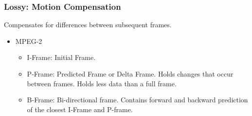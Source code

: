\documentclass{beamer}
\begin{document}
   
\begin{frame}
   \frametitle{Lossy: Motion Compensation}
   Compensates for differences between subsequent frames.
   \begin{itemize}
   \item{MPEG-2}
      \begin{itemize}
      \item{I-Frame: Initial Frame.}
      \pause
      \item{P-Frame: Predicted Frame or Delta Frame. Holds changes that occur between frames. Holds less data than a full frame.}
      \pause
      \item{B-Frame: Bi-directional frame. Contains forward and backward prediction of the closest I-Frame and P-frame.}
      \end{itemize}
   \end{itemize}
\end{frame}
\end{document}
